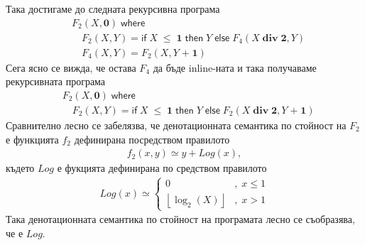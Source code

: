 \documentclass[14pt]{extarticle}
\begin{document}
Така достигаме до следната рекурсивна програма
\begin{align*}
    & F_2(X, \mathbf 0) \; \mathsf{where} \\
    & \quad F_2(X, Y) = \mathsf{if} \; X \;\mathbf{\leq}\; \mathbf 1 \; \mathsf{then} \; Y  \; \mathsf{else} \; F_4(X \;\mathbf{div}\; \mathbf 2, Y) \\
    & \quad F_4(X, Y) = F_2(X, Y \;\mathbf{+}\; \mathbf 1)
\end{align*}
Сега ясно се вижда, че остава \(F_4\) да бъде inline-ната и така получаваме рекурсивната програма
\begin{align*}
    & F_2(X, \mathbf 0) \; \mathsf{where} \\
    & \quad F_2(X, Y) = \mathsf{if} \; X \;\mathbf{\leq}\; \mathbf 1 \; \mathsf{then} \; Y  \; \mathsf{else} \; F_2(X \;\mathbf{div}\; \mathbf 2, Y \;\mathbf{+}\; \mathbf 1)
\end{align*}
Сравнително лесно се забелязва, че денотационната семантика по стойност на \(F_2\) е функцията \(f_2\) дефинирана посредством правилото
\begin{align*}
    f_2(x, y) \simeq y + Log(x),
\end{align*}
където \(Log\) е фукцията дефинирана по средством правилото
\begin{align*}
    Log(x) \simeq \begin{cases}
        0 & ,\; x \leq 1 \\
        \left\lfloor \displaystyle \log_2(X) \right\rfloor &, \; x > 1
    \end{cases}
\end{align*}
Така денотационната семантика по стойност на програмата лесно се съобразява, че е \(Log\). \\
\end{document}

